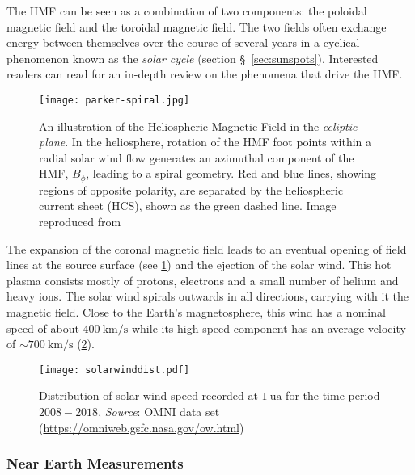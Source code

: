The HMF can be seen as a combination of two components: the poloidal magnetic field and the 
toroidal magnetic field. The two fields often exchange energy between themselves over the course of 
several years in a cyclical phenomenon known as the \emph{solar cycle} (section 
\S~\ref{sec:sunspots}). Interested readers can read \citet{Owens2013} for an in-depth review on the 
phenomena that drive the HMF. 

\begin{figure}
    \noindent\texttt{[image: parker-spiral.jpg]}
    \caption{
        {\small 
            An illustration of the Heliospheric Magnetic Field in the \emph{ecliptic plane}. In the 
            heliosphere, rotation of the HMF foot points within a radial solar wind flow generates 
            an azimuthal component of the HMF, $B_{\phi}$, leading to a spiral geometry. Red and 
            blue lines, showing regions of opposite polarity, are separated by the heliospheric 
            current sheet (HCS), shown as the green dashed line. Image reproduced from 
            \citet{Owens2013}
        }
    }\label{fig:parkerspiral}
\end{figure}


The expansion of the coronal magnetic field leads to an eventual opening of field lines at the 
source surface (see \cref{fig:parkerspiral}) and the ejection of the solar wind. This hot plasma 
consists mostly of protons, electrons and a small number of helium and heavy ions. The solar wind 
spirals outwards in all directions, carrying with it the magnetic field. Close to the Earth's 
magnetosphere, this wind has a nominal speed of about $\SI{400}{\kilo\metre\per\second}$ while its 
high speed component has an average velocity of $\sim \SI{700}{\kilo\metre\per\second}$ 
(\cref{fig:solarwinddist}).

\begin{figure}
    \noindent\centering\texttt{[image: solarwinddist.pdf]}
    \caption{
        {\small 
            Distribution of solar wind speed recorded at $\SI{1}{\astronomicalunit}$ for the time 
            period $2008 - 2018$, \textit{Source}: OMNI data set 
            (\url{https://omniweb.gsfc.nasa.gov/ow.html})
        }
    }\label{fig:solarwinddist}
\end{figure}

\subsubsection*{Near Earth Measurements}


